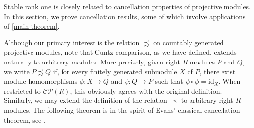 \documentclass[11pt]{amsart}
\numberwithin{equation}{section}
\theoremstyle{definition}
\theoremstyle{plain}
\theoremstyle{definition}
\begin{document}
%

Stable rank one is closely related to cancellation properties of projective modules. In this section, we prove cancellation results, some of which involve applications of \autoref{main theorem}.

Although our primary interest is the relation $\precsim$ on countably generated projective modules, note that Cuntz comparison, as we have defined, extends naturally to arbitrary modules. More precisely, given right $R$-modules $P$ and $Q$, we write $P \precsim Q$ if, for every finitely generated submodule $X$ of $P$, there exist module homomorphisms $\phi\colon X \rightarrow Q$ and $\psi\colon Q \rightarrow P$ such that $\psi\circ\phi = \mathrm{id}_X$. When restricted to $\mathcal{CP}(R)$, this obviously agrees with the original definition. Similarly, we may extend the definition of the relation $\prec$ to arbitrary right $R$-modules. The following theorem is in the spirit of Evans' classical cancellation theorem, see \cite[Theorem 2]{Evans1973}. 
\end{document}
